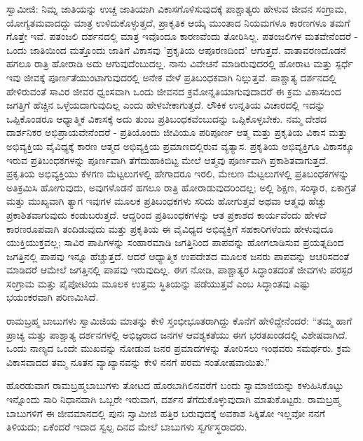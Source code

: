 ಸ್ವಾಮೀಜಿ: ನಿಮ್ನ ಜಾತಿಯನ್ನು ಉಚ್ಚ ಜಾತಿಯಾಗಿ ವಿಕಾಸಗೊಳಿಸುವುದಕ್ಕೆ ಪಾಶ್ಚಾತ್ಯರು ಹೇಳುವ ಜೀವನ ಸಂಗ್ರಾಮ, ಯೋಗ್ಯತಮವಾದದ್ದು ಮಾತ್ರ ಉಳಿದುಕೊಳ್ಳುತ್ತದೆ, ಪ್ರಾಕೃತಿಕ ಆಯ್ಕೆ ಮುಂತಾದ ನಿಯಮಗಳೂ ಕಾರಣಗಳೂ ತಮಗೆ ಗೊತ್ತೇ ಇವೆ. ಪತಂಜಲಿ ದರ್ಶನದಲ್ಲಿ ಮಾತ್ರ ಇವೊಂದೂ ಕಾರಣವೆಂದು ತೋರಿಸಿಲ್ಲ. ಪತಂಜಲಿಗಳ ಮತವೇನೆಂದರೆ - ಒಂದು ಜಾತಿಯಿಂದ ಮತ್ತೊಂದು ಜಾತಿಗೆ ವಿಕಾಸವು 'ಪ್ರಕೃತಿಯ ಆಪೂರಣದಿಂದ' ಆಗುತ್ತದೆ. ವಾತಾವರಣದೊಡನೆ ಹಗಲೂ ರಾತ್ರಿ ಹೋರಾಡಿ ಅದು ಆಗುವುದೆಂಬುದಲ್ಲ. ನಾನು ವಿವೇಚನೆ ಮಾಡಿರುವುದರಲ್ಲಿ ಹೋರಾಟ ಮತ್ತು ಸ್ಪರ್ಧೆ ಇವು ಜೀವಕ್ಕೆ ಪೂರ್ಣತೆಯುಂಟಾಗುವುದರಲ್ಲಿ ಅನೇಕ ವೇಳೆ ಪ್ರತಿಬಂಧಕವಾಗಿ ನಿಲ್ಲುತ್ತವೆ. ಪಾಶ್ಚಾತ್ಯ ದರ್ಶನದಲ್ಲಿ ಹೇಳಿರುವಂತೆ ಸಾವಿರ ಜೀವರ ಧ್ವಂಸವಾಗಿ ಒಂದು ಜೀವನದ ಕ್ರಮೋನ್ನತಿಯಾಗುವುದಾದರೆ ಈ ಕ್ರಮ ವಿಕಾಸದಿಂದ ಜಗತ್ತಿಗೆ ಹೆಚ್ಚಿನ ಒಳ್ಳೆಯದಾಗುವುದಿಲ್ಲ ಎಂದು ಹೇಳಬೇಕಾಗುತ್ತದೆ. ಲೌಕಿಕ ಉನ್ನತಿಯ ವಿಚಾರದಲ್ಲಿ ಇದನ್ನು ಒಪ್ಪಿಕೊಂಡರೂ ಆಧ್ಯಾತ್ಮಿಕ ವಿಕಾಸಕ್ಕೆ ಅದು ತುಂಬ ಪ್ರತಿಬಂಧಕವೆಂಬುದನ್ನು ಒಪ್ಪಿಕೊಳ್ಳಬೇಕು. ನಮ್ಮ ದೇಶದ ದಾರ್ಶನಿಕರ ಅಭಿಪ್ರಾಯವೇನೆಂದರೆ - ಪ್ರತಿಯೊಂದು ಜೀವಿಯೂ ಪರಿಪೂರ್ಣ ಆತ್ಮ ಮತ್ತು ಪ್ರಕೃತಿಯ ವಿಕಾಸ ಮತ್ತು ಅಭಿವ್ಯಕ್ತಿಯ ವೈವಿಧ್ಯಕ್ಕೆ ಕಾರಣ ಆತ್ಮದ ಅಭಿವ್ಯಕ್ತಿಯ ಪ್ರಮಾಣದಲ್ಲಿರುವ ವ್ಯತ್ಯಾಸ. ಪ್ರಕೃತಿಯ ಅಭಿವ್ಯಕ್ತಿಗೂ ವಿಕಾಸಕ್ಕೂ ಇರುವ ಪ್ರತಿಬಂಧಕಗಳನ್ನು ಪೂರ್ಣವಾಗಿ ತೆಗೆದುಹಾಕಿಬಿಟ್ಟ ಮೇಲೆ ಆತ್ಮವು ಪೂರ್ಣವಾಗಿ ಪ್ರಕಾಶಿತವಾಗುತ್ತದೆ. ಪ್ರಕೃತಿಯ ಅಭಿವ್ಯಕ್ತಿಯು ಕೆಳಗಣ ಮೆಟ್ಟಲುಗಳಲ್ಲಿ ಹೇಗಾದರೂ ಇರಲಿ, ಮೇಲಣ ಮೆಟ್ಟಲುಗಳಲ್ಲಿ ಪ್ರತಿಬಂಧಕಗಳನ್ನು ಅತಿಕ್ರಮಿಸಿ ಹೋಗುವುದು, ಅವುಗಳೊಡನೆ ಹಗಲೂ ರಾತ್ರಿ ಹೋರಾಡುವುದರಿಂದಲ್ಲ; ಅಲ್ಲಿ ಶಿಕ್ಷಣ, ಸಂಸ್ಕಾರ, ಏಕಾಗ್ರತೆ ಮತ್ತು ಮುಖ್ಯವಾಗಿ ತ್ಯಾಗ ಇವುಗಳ ಮೂಲಕ ಪ್ರತಿಬಂಧಕಗಳು ಸರಿದು ಹೋಗುತ್ತವೆ ಅಥವಾ ಆತ್ಮವು ಹೆಚ್ಚು ಪ್ರಕಾಶಿತವಾಗುವುದು ಕಂಡುಬರುತ್ತದೆ. ಆದ್ದರಿಂದ ಪ್ರತಿಬಂಧಕಗಳನ್ನು ಆತ ಪ್ರಕಾಶದ ಕಾರ್ಯವೆಂದು ಹೇಳದೆ ಕಾರಣರೂಪವಾಗಿ ತಂದಿಡುವುದು ಮತ್ತು ಪ್ರಕೃತಿಯ ಈ ವೈವಿಧ್ಯದ ಅಭಿವ್ಯಕ್ತಿಗೆ ಸಹಕಾರಿಗಳೆಂದು ಹೇಳುವುದೂ ಯುಕ್ತಿಯುಕ್ತವಲ್ಲ; ಸಾವಿರ ಪಾಪಿಗಳನ್ನು ಸಂಹಾರಮಾಡಿ ಜಗತ್ತಿನಿಂದ ಪಾಪವನ್ನು ಹೋಗಲಾಡಿಸುವ ಪ್ರಯತ್ನದಿಂದ ಜಗತ್ತಿನಲ್ಲಿ ಪಾಪವು ಇನ್ನೂ ಹೆಚ್ಚುತ್ತದೆ. ಆದರೆ ಆಧ್ಯಾತ್ಮಿಕ ಉಪದೇಶದ ಮೂಲಕ ಜನರು ಪಾಪವನ್ನು ಆಚರಿಸದಂತೆ ಮಾಡಿದರೆ ಆಮೇಲೆ ಜಗತ್ತಿನಲ್ಲಿ ಪಾಪವು ಇರುವುದಿಲ್ಲ. ಈಗ ನೋಡಿ, ಪಾಶ್ಚಾತ್ಯರ ಸಿದ್ಧಾಂತದಂತೆ ಜೀವಗಳು ಪರಸ್ಪರ ಸಂಗ್ರಾಮ ಮತ್ತು ಪೈಪೋಟಿಯ ಮೂಲಕ ಉತ್ತಮ ಸ್ಥಿತಿಯನ್ನು ಪಡೆಯುತ್ತವೆ ಎಂಬ ಸಿದ್ಧಾಂತವು ಎಷ್ಟು ಭಯಂಕರವಾಗಿ ಪರಿಣಮಿಸಿದೆ.

ರಾಮಬ್ರಹ್ಮ ಬಾಬುಗಳು ಸ್ವಾಮಿಜಿಯ ಮಾತನ್ನು ಕೇಳಿ ಸ್ತಂಭೀಭೂತರಾಗಿದ್ದು ಕೊನೆಗೆ ಹೇಳಿದ್ದೇನೆಂದರೆ: “ತಮ್ಮ ಹಾಗೆ ಪ್ರಾಚ್ಯ ಮತ್ತು ಪಾಶ್ಚಾತ್ಯ ದರ್ಶನಗಳಲ್ಲಿ ಅಭಿಜ್ಞರಾದ ಜನಗಳ ಆವಶ್ಯಕತೆಯು ಈಗ ಭರತಖಂಡದಲ್ಲಿ ವಿಶೇಷವಾಗಿದೆ. ಒಂದು ನಾಣ್ಯದ ಒಂದೇ ಮುಖವನ್ನು ನೋಡುವ ಜನರ ಪ್ರಮಾದಗಳನ್ನು ತೋರಿಸಲು ಇಂಥವರು ಸಮರ್ಥರು. ಕ್ರಮ ವಿಕಾಸವಾದದ ತಮ್ಮ ನೂತನ ವ್ಯಾಖ್ಯಾನವನ್ನು ಕೇಳಿ ನನಗೆ ಪರಮ ಸಂತೋಷವಾಯಿತು.”

ಹೊರಡುವಾಗ ರಾಮಬ್ರಹ್ಮಬಾಬುಗಳು ತೋಟದ ಹೊರಬಾಗಿಲಿನವರೆಗೆ ಬಂದು ಸ್ವಾಮಾಜಿಯನ್ನು ಕಳುಹಿಸಿಕೊಟ್ಟು ಇನ್ನೊಂದು ಸಾರಿ ನಿಧಾನವಾಗಿ ಒಬ್ಬರೇ ಇರುವಾಗ, ದರ್ಶನ ತೆಗೆದುಕೊಳ್ಳುವುದಾಗಿ ಮಾತುಕೊಟ್ಟರು. ರಾಮಬ್ರಹ್ಮ ಬಾಬುಗಳಿಗೆ ಈ ಜೀವಮಾನದಲ್ಲಿ ಪುನಃ ಸ್ವಾಮೀಜಿ ಹತ್ತಿರ ಬರುವುದಕ್ಕೆ ಅವಕಾಶ ಸಿಕ್ಕಿತೋ ಇಲ್ಲವೋ ನನಗೆ ತಿಳಿಯದು; ಏಕೆಂದರೆ ಇದಾದ ಸ್ವಲ್ಪ ದಿನದ ಮೇಲೆ ಬಾಬುಗಳು ಸ್ವರ್ಗಸ್ಥರಾದರು.


